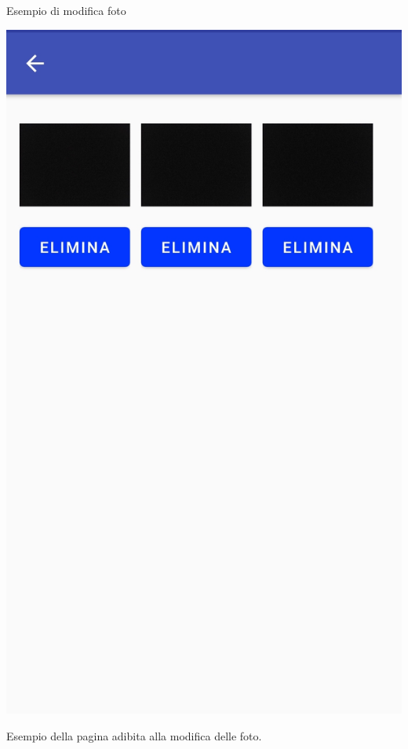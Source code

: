 \documentclass[11pt,aspectratio=169]{beamer}
\begin{document}
\begin{frame}{Esempio di modifica foto}
\noindent
    \begin{minipage}{0.3\textwidth}
    \includegraphics[scale=0.1]{Tesi/images/ModificaFoto.jpg}
    \end{minipage}
\hfill
\begin{minipage}{0.6\textwidth}
Esempio della pagina adibita alla modifica delle foto.
\end{minipage}
\end{frame}
\end{document}
